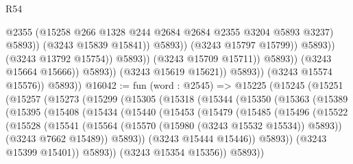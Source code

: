 \begin{lexlean}{R54}
\begin{coremodule}
                                                  @2355
                                                  (@15258
                                                    @266
                                                    @1328
                                                    @244
                                                    @2684
                                                    @2684
                                                    @2355
                                                    @3204
                                                    @5893
                                                    @3237)
                                                  @5893))
                                              (@3243 @15839 @15841))
                                            @5893))
                                        (@3243 @15797 @15799))
                                      @5893))
                                  (@3243 @13792 @15754))
                                @5893))
                            (@3243 @15709 @15711))
                          @5893))
                      (@3243 @15664 @15666))
                    @5893))
                (@3243 @15619 @15621))
              @5893))
          (@3243 @15574 @15576))
        @5893))
@16042 := fun (word : @2545) =>
  @15225
    (@15245
      (@15251
        (@15257
          (@15273
            (@15299
              (@15305
                (@15318
                  (@15344
                    (@15350
                      (@15363
                        (@15389
                          (@15395
                            (@15408
                              (@15434
                                (@15440
                                  (@15453
                                    (@15479
                                      (@15485
                                        (@15496
                                          (@15522
                                            (@15528
                                              (@15541
                                                (@15564
                                                  (@15570 (@15980 (@3243 @15532 @15534)) @5893))
                                                (@3243 @7662 @15489))
                                              @5893))
                                          (@3243 @15444 @15446))
                                        @5893))
                                    (@3243 @15399 @15401))
                                  @5893))
                              (@3243 @15354 @15356))
                            @5893))

\end{coremodule}
\end{lexlean}
